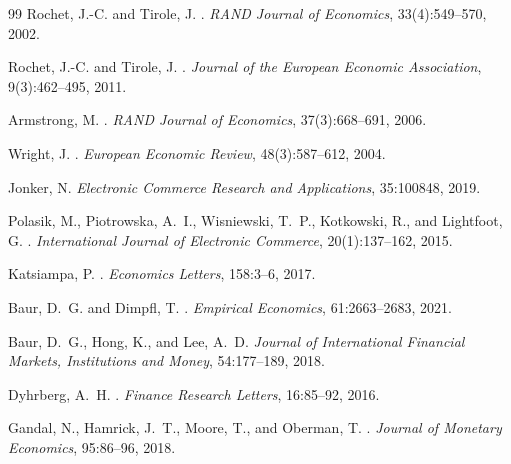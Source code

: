 \documentclass{article}
\begin{document}
\begin{thebibliography}{99}
Rochet, J.-C. and Tirole, J.
.
\newblock \emph{RAND Journal of Economics}, 33(4):549--570, 2002.

Rochet, J.-C. and Tirole, J.
.
\newblock \emph{Journal of the European Economic Association}, 9(3):462--495,
  2011.

Armstrong, M.
.
\newblock \emph{RAND Journal of Economics}, 37(3):668--691, 2006.

Wright, J.
.
\newblock \emph{European Economic Review}, 48(3):587--612, 2004.

Jonker, N.
\newblock \emph{Electronic Commerce Research and Applications}, 35:100848,
  2019.

Polasik, M., Piotrowska, A.~I., Wisniewski, T.~P., Kotkowski, R., and
  Lightfoot, G.
.
\newblock \emph{International Journal of Electronic Commerce}, 20(1):137--162,
  2015.

Katsiampa, P.
.
\newblock \emph{Economics Letters}, 158:3--6, 2017.

Baur, D.~G. and Dimpfl, T.
.
\newblock \emph{Empirical Economics}, 61:2663--2683, 2021.

Baur, D.~G., Hong, K., and Lee, A.~D.
\newblock \emph{Journal of International Financial Markets, Institutions and
  Money}, 54:177--189, 2018.

Dyhrberg, A.~H.
.
\newblock \emph{Finance Research Letters}, 16:85--92, 2016.

Gandal, N., Hamrick, J.~T., Moore, T., and Oberman, T.
.
\newblock \emph{Journal of Monetary Economics}, 95:86--96, 2018.


\end{thebibliography}
\end{document}
